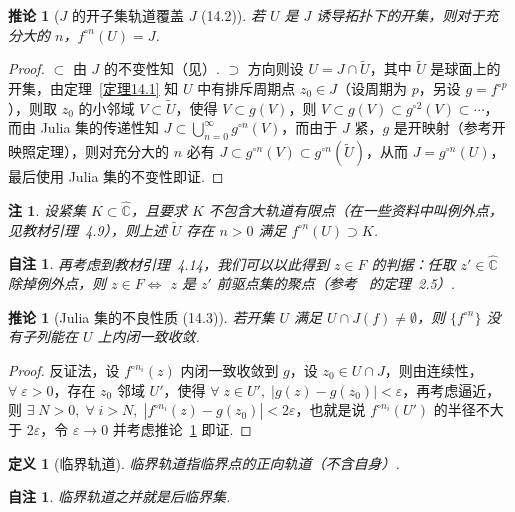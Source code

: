 \documentclass[11pt, a4paper, oneside]{ctexart}
\newtheorem{corollary}[theorem]{推论}
\newtheorem{definition}[theorem]{定义}
\newtheorem{note}[theorem]{自注}
\newtheorem{remark}[theorem]{注}
\newcommand{\C}{\mathbb{C}}
\newcommand{\abs}[1]{\left|{#1}\right|}
\begin{document}
    \begin{corollary}[$J$ 的开子集轨道覆盖 $J$ (14.2)]\label{推论14.2}
        若 $U$ 是 $J$ 诱导拓扑下的开集，则对于充分大的 $n$，$f^{\circ n}(U)=J$.
    \end{corollary}
    \begin{proof}
        $\subset$ 由 $J$ 的不变性知（见）. $\supset$ 方向则设 $U=J\cap \tilde{U}$，其中 $\tilde{U}$ 是球面上的开集，由定理~\ref{定理14.1} 知 $U$ 中有排斥周期点 $z_0\in J$（设周期为 $p$，另设 $g=f^{\circ p}$），则取 $z_0$ 的小邻域 $V\subset\tilde{U}$，使得 $V\subset g(V)$，则 $V\subset g(V)\subset g^{\circ 2}(V)\subset\cdots$，而由 Julia 集的传递性知 $J\subset \bigcup\limits_{n=0}^{\infty}g^{\circ n}(V)$，而由于 $J$ 紧，$g$ 是开映射（参考开映照定理），则对充分大的 $n$ 必有 $J\subset g^{\circ n}(V)\subset g^{\circ n}(\tilde{U})$，从而 $J=g^{\circ n}(U)$，最后使用 Julia 集的不变性即证.
    \end{proof}
    \begin{remark}
        设紧集 $K\subset\hat{\C}$，且要求 $K$ 不包含大轨道有限点（在一些资料中叫例外点，见教材引理~4.9），则上述 $\tilde{U}$ 存在 $n>0$ 满足 $f^{\circ n}(U)\supset K$.
    \end{remark}
    \begin{note}
        再考虑到教材引理~4.14，我们可以以此得到 $z\in F$ 的判据：任取 $z'\in \hat{\C}$ 除掉例外点，则 $z\in F\Leftrightarrow$ $z$ 是 $z'$ 前驱点集的聚点（参考~\cite{Brolin} 的定理~2.5）.
    \end{note}

    \begin{corollary}[Julia 集的不良性质 (14.3)]
        若开集 $U$ 满足 $U\cap J(f)\neq\emptyset$，则 $\{f^{\circ n}\}$ 没有子列能在 $U$ 上内闭一致收敛.
    \end{corollary}
    \begin{proof}
        反证法，设 $f^{\circ n_i}(z)$ 内闭一致收敛到 $g$，设 $z_0\in U\cap J$，则由连续性，$\forall\; \varepsilon>0$，存在 $z_0$ 邻域 $U'$，使得 $\forall\; z\in U',\; \abs{g(z)-g(z_0)}<\varepsilon$，再考虑逼近，则 $\exists\; N>0,\; \forall\; i>N,\; \abs{f^{\circ n_i}(z)-g(z_0)}<2\varepsilon$，也就是说 $f^{\circ n_i}(U')$ 的半径不大于 $2\varepsilon$，令 $\varepsilon\to 0$ 并考虑推论~\ref{推论14.2} 即证.
    \end{proof}

    \begin{definition}[临界轨道]
        临界轨道指临界点的正向轨道（不含自身）.
    \end{definition}
    \begin{note}
        临界轨道之并就是后临界集.
    \end{note}
\end{document}
